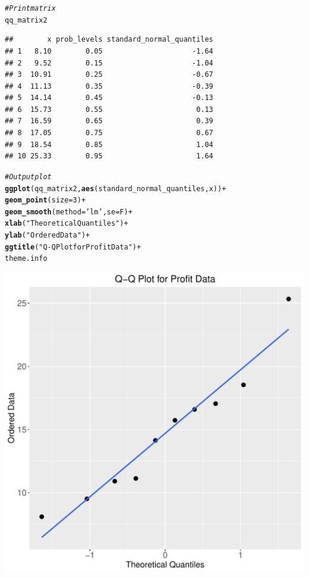 \documentclass[12pt]{article}\usepackage[]{graphicx}\usepackage[]{color}
\makeatletter
\def\maxwidth{ %
  \ifdim\Gin@nat@width>\linewidth
    \linewidth
  \else
    \Gin@nat@width
  \fi
}
\newcommand{\hlnum}[1]{\textcolor[rgb]{0.686,0.059,0.569}{#1}}%
\newcommand{\hlstr}[1]{\textcolor[rgb]{0.192,0.494,0.8}{#1}}%
\newcommand{\hlcom}[1]{\textcolor[rgb]{0.678,0.584,0.686}{\textit{#1}}}%
\newcommand{\hlopt}[1]{\textcolor[rgb]{0,0,0}{#1}}%
\newcommand{\hlstd}[1]{\textcolor[rgb]{0.345,0.345,0.345}{#1}}%
\newcommand{\hlkwc}[1]{\textcolor[rgb]{0.333,0.667,0.333}{#1}}%
\newcommand{\hlkwd}[1]{\textcolor[rgb]{0.737,0.353,0.396}{\textbf{#1}}}%
\newenvironment{kframe}{%
 \def\at@end@of@kframe{}%
 \ifinner\ifhmode%
  \def\at@end@of@kframe{\end{minipage}}%
  \begin{minipage}{\columnwidth}%
 \fi\fi%
 \def\FrameCommand##1{\hskip\@totalleftmargin \hskip-\fboxsep
 \colorbox{shadecolor}{##1}\hskip-\fboxsep
     \hskip-\linewidth \hskip-\@totalleftmargin \hskip\columnwidth}%
 \MakeFramed {\advance\hsize-\width
   \@totalleftmargin\z@ \linewidth\hsize
   \@setminipage}}%
 {\par\unskip\endMakeFramed%
 \at@end@of@kframe}
\newenvironment{knitrout}{}{} %
\makeatother
\begin{document}
\begin{enumerate}[a)]
\begin{knitrout}
\begin{kframe}
\begin{alltt}
\hlcom{#Print matrix}
\hlstd{qq_matrix2}
\end{alltt}
\begin{verbatim}
##        x prob_levels standard_normal_quantiles
## 1   8.10        0.05                     -1.64
## 2   9.52        0.15                     -1.04
## 3  10.91        0.25                     -0.67
## 4  11.13        0.35                     -0.39
## 5  14.14        0.45                     -0.13
## 6  15.73        0.55                      0.13
## 7  16.59        0.65                      0.39
## 8  17.05        0.75                      0.67
## 9  18.54        0.85                      1.04
## 10 25.33        0.95                      1.64
\end{verbatim}
\begin{alltt}
\hlcom{#Output plot}
\hlkwd{ggplot}\hlstd{(qq_matrix2,} \hlkwd{aes}\hlstd{(standard_normal_quantiles, x))} \hlopt{+}
  \hlkwd{geom_point}\hlstd{(}\hlkwc{size}\hlstd{=}\hlnum{3}\hlstd{)} \hlopt{+}
  \hlkwd{geom_smooth}\hlstd{(}\hlkwc{method}\hlstd{=}\hlstr{'lm'}\hlstd{,} \hlkwc{se}\hlstd{=F)} \hlopt{+}
  \hlkwd{xlab}\hlstd{(}\hlstr{"Theoretical Quantiles"}\hlstd{)} \hlopt{+}
  \hlkwd{ylab}\hlstd{(}\hlstr{"Ordered Data"}\hlstd{)} \hlopt{+}
  \hlkwd{ggtitle}\hlstd{(}\hlstr{"Q-Q Plot for Profit Data"}\hlstd{)} \hlopt{+}
  \hlstd{theme.info}
\end{alltt}
\end{kframe}
\includegraphics[width=\maxwidth]{figure/unnamed-chunk-6-1} 


\end{knitrout}
\end{enumerate}
\end{document}
